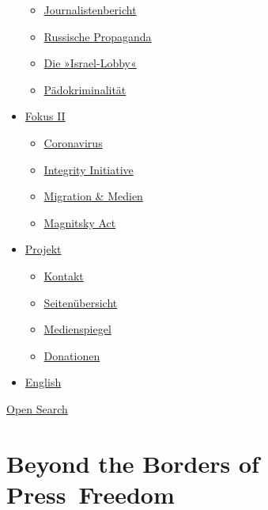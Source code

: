 \begin{itemize}
  \begin{itemize}
  \tightlist
  \item
    \href{https://swprs.org/bericht-eines-journalisten/}{Journalistenbericht}
  \item
    \href{https://swprs.org/russische-propaganda/}{Russische Propaganda}
  \item
    \href{https://swprs.org/die-israel-lobby-fakten-und-mythen/}{Die
    »Israel-Lobby«}
  \item
    \href{https://swprs.org/geopolitik-und-paedokriminalitaet/}{Pädokriminalität}
  \end{itemize}
\item
  \href{https://swprs.org/migration-und-medien/}{Fokus II}

  \begin{itemize}
  \tightlist
  \item
    \href{https://swprs.org/covid-19-hinweis-ii/}{Coronavirus}
  \item
    \href{https://swprs.org/die-integrity-initiative/}{Integrity
    Initiative}
  \item
    \href{https://swprs.org/migration-und-medien/}{Migration \& Medien}
  \item
    \href{https://swprs.org/der-fall-magnitsky/}{Magnitsky Act}
  \end{itemize}
\item
  \href{https://swprs.org/kontakt/}{Projekt}

  \begin{itemize}
  \tightlist
  \item
    \href{https://swprs.org/kontakt/}{Kontakt}
  \item
    \href{https://swprs.org/uebersicht/}{Seitenübersicht}
  \item
    \href{https://swprs.org/medienspiegel/}{Medienspiegel}
  \item
    \href{https://swprs.org/donationen/}{Donationen}
  \end{itemize}
\item
  \href{https://swprs.org/contact/}{English}
\end{itemize}

\protect\hyperlink{}{Open Search}

\hypertarget{beyond-the-borders-of-press-freedom}{%
\section{Beyond the Borders of
Press~Freedom}\label{beyond-the-borders-of-press-freedom}}

